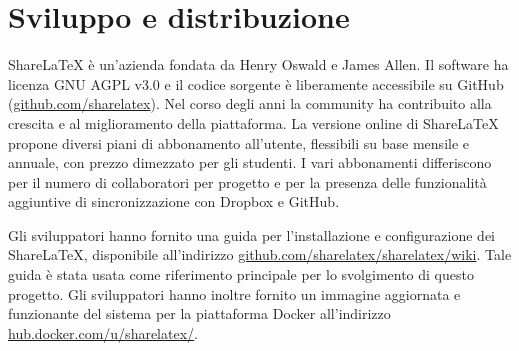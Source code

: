 \section{Sviluppo e distribuzione}
ShareLaTeX è un'azienda fondata da Henry Oswald e James Allen. Il software ha licenza GNU AGPL v3.0 e il codice sorgente è liberamente accessibile su GitHub (\url{github.com/sharelatex}). Nel corso degli anni la community ha contribuito alla crescita e al miglioramento della piattaforma. La versione online di ShareLaTeX propone diversi piani di abbonamento all'utente, flessibili su base mensile e annuale, con prezzo dimezzato per gli studenti. I vari abbonamenti differiscono per il numero di collaboratori per progetto e per la presenza delle funzionalità aggiuntive di sincronizzazione con Dropbox e GitHub.

Gli sviluppatori hanno fornito una guida per l'installazione e configurazione dei ShareLaTeX, disponibile all'indirizzo \url{github.com/sharelatex/sharelatex/wiki}. Tale guida è stata usata come riferimento principale per lo svolgimento di questo progetto. Gli sviluppatori hanno inoltre fornito un immagine aggiornata e funzionante del sistema per la piattaforma Docker all'indirizzo \url{hub.docker.com/u/sharelatex/}.

